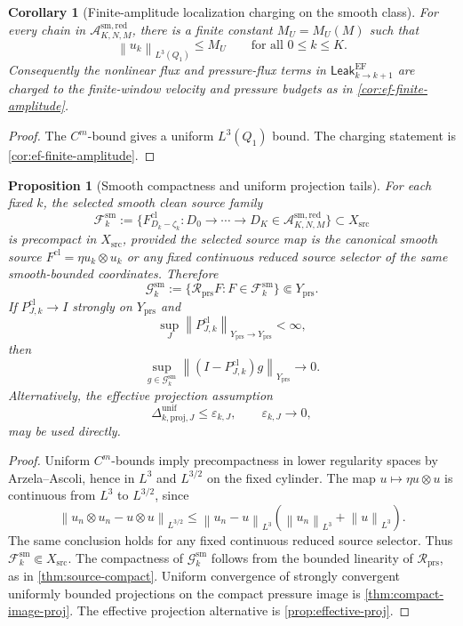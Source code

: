\documentclass[11pt]{article}
\numberwithin{equation}{section}
\theoremstyle{plain}
\newtheorem{proposition}[theorem]{Proposition}
\newtheorem{corollary}[theorem]{Corollary}
\theoremstyle{definition}
\theoremstyle{remark}
\newcommand{\cl}{\mathrm{cl}}
\newcommand{\prs}{\mathrm{prs}}
\newcommand{\proj}{\mathrm{proj}}
\newcommand{\Leak}{\mathsf{Leak}}
\newcommand{\A}{\mathcal A}
\newcommand{\F}{\mathcal F}
\newcommand{\Rprs}{\mathcal R_{\prs}}
\newcommand{\norm}[1]{\left\lVert #1\right\rVert}
\begin{document}
\begin{corollary}[Finite-amplitude localization charging on the smooth class]\label{cor:smred-ef-amplitude}
For every chain in \(\A_{K,N,M}^{\mathrm{sm,red}}\), there is a finite
constant \(M_U=M_U(M)\) such that
\[
  \norm{u_k}_{L^3(Q_1)}\le M_U
  \qquad\text{for all }0\le k\le K.
\]
Consequently the nonlinear flux and pressure-flux terms in
\(\Leak_{k\to k+1}^{\mathrm{EF}}\) are charged to the finite-window velocity
and pressure budgets as in \cref{cor:ef-finite-amplitude}.
\end{corollary}

\begin{proof}
The \(C^m\)-bound gives a uniform \(L^3(Q_1)\) bound.  The charging statement
is \cref{cor:ef-finite-amplitude}.
\end{proof}

\begin{proposition}[Smooth compactness and uniform projection tails]\label{prop:smred-projection}
For each fixed \(k\), the selected smooth clean source family
\[
  \F_k^{\mathrm{sm}}
  :=
  \{F_{D_k-\zeta_k}^{\cl}:
    D_0\to\cdots\to D_K\in\A_{K,N,M}^{\mathrm{sm,red}}\}
  \subset X_{\mathrm{src}}
\]
is precompact in \(X_{\mathrm{src}}\), provided the selected source map is
the canonical smooth source \(F^{\cl}=\eta u_k\otimes u_k\) or any fixed
continuous reduced source selector of the same smooth-bounded coordinates.
Therefore
\[
  \mathcal G_k^{\mathrm{sm}}
  :=
  \{\Rprs F:F\in\F_k^{\mathrm{sm}}\}
  \Subset Y_{\prs}.
\]
If \(P_{J,k}^{\cl}\to I\) strongly on \(Y_{\prs}\) and
\[
  \sup_J\norm{P_{J,k}^{\cl}}_{Y_{\prs}\to Y_{\prs}}<\infty,
\]
then
\[
  \sup_{g\in\mathcal G_k^{\mathrm{sm}}}
  \norm{(I-P_{J,k}^{\cl})g}_{Y_{\prs}}\to0.
\]
Alternatively, the effective projection assumption
\[
  \Delta_{k,\proj,J}^{\mathrm{unif}}\le\varepsilon_{k,J},
  \qquad
  \varepsilon_{k,J}\to0,
\]
may be used directly.
\end{proposition}

\begin{proof}
Uniform \(C^m\)-bounds imply precompactness in lower regularity spaces by
Arzela--Ascoli, hence in \(L^3\) and \(L^{3/2}\) on the fixed cylinder.  The
map \(u\mapsto\eta u\otimes u\) is continuous from \(L^3\) to
\(L^{3/2}\), since
\[
  \norm{u_n\otimes u_n-u\otimes u}_{L^{3/2}}
  \le
  \norm{u_n-u}_{L^3}
  \left(\norm{u_n}_{L^3}+\norm{u}_{L^3}\right).
\]
The same conclusion holds for any fixed continuous reduced source selector.
Thus \(\F_k^{\mathrm{sm}}\Subset X_{\mathrm{src}}\).  The compactness of
\(\mathcal G_k^{\mathrm{sm}}\) follows from the bounded linearity of
\(\Rprs\), as in \cref{thm:source-compact}.  Uniform convergence of
strongly convergent uniformly bounded projections on the compact pressure
image is \cref{thm:compact-image-proj}.  The effective projection alternative
is \cref{prop:effective-proj}.
\end{proof}
\end{document}
